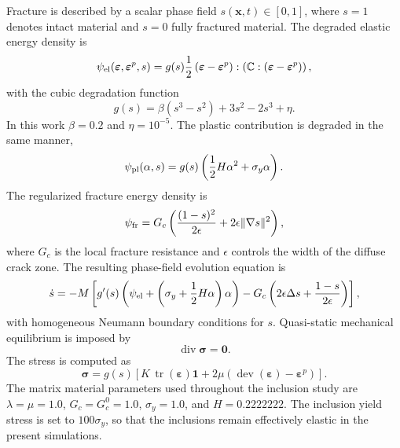 \documentclass[pdflatex,sn-mathphys-num]{sn-jnl}
\newcommand{\GcZero}{G_c^0}
\begin{document}
Fracture is described by a scalar phase field \(s(\boldsymbol{x},t)\in[0,1]\), where \(s=1\) denotes intact material and \(s=0\) fully fractured material. The degraded elastic energy density is
\begin{equation}
    \psi_{\rm el}(\boldsymbol{\varepsilon},\boldsymbol{\varepsilon}^p,s)
    = g(s)\frac{1}{2}
    \left(\boldsymbol{\varepsilon}-\boldsymbol{\varepsilon}^p\right)
    :
    \left(\boldsymbol{\mathbb{C}}:
    \left(\boldsymbol{\varepsilon}-\boldsymbol{\varepsilon}^p\right)\right),
\end{equation}
with the cubic degradation function
\begin{equation}
    g(s)=\beta(s^3-s^2)+3s^2-2s^3+\eta .
    \label{eq:deg_grad}
\end{equation}
In this work \(\beta=0.2\) and \(\eta=10^{-5}\). The plastic contribution is degraded in the same manner,
\begin{equation}
    \psi_{\rm pl}(\alpha,s)=g(s)\left(\frac{1}{2}H\alpha^2+\sigma_y\alpha\right).
\end{equation}
The regularized fracture energy density is
\begin{equation}
    \psi_{\rm fr}=G_c\left(\frac{(1-s)^2}{2\epsilon}+2\epsilon\|\nabla s\|^2\right),
\end{equation}
where \(G_c\) is the local fracture resistance and \(\epsilon\) controls the width of the diffuse crack zone. The resulting phase-field evolution equation is
\begin{align}
    \dot{s}=-M\left[
    g'(s)\left(\psi_{\rm el}+\left(\sigma_y+\frac{1}{2}H\alpha\right)\alpha\right)
    -G_c\left(2\epsilon\Delta s+\frac{1-s}{2\epsilon}\right)
    \right],
    \label{eq:evolution_s}
\end{align}
with homogeneous Neumann boundary conditions for \(s\). Quasi-static mechanical equilibrium is imposed by
\begin{equation}
    \operatorname{div}\boldsymbol{\sigma}=\boldsymbol{0}.
    \label{eq:equilibrium}
\end{equation}
The stress is computed as
\begin{equation}
    \boldsymbol{\sigma}=g(s)\left[
    K\,\operatorname{tr}(\boldsymbol{\varepsilon})\boldsymbol{1}
    +2\mu\left(\operatorname{dev}(\boldsymbol{\varepsilon})-\boldsymbol{\varepsilon}^p\right)
    \right].
    \label{eq:sigma_plast}
\end{equation}
The matrix material parameters used throughout the inclusion study are \(\lambda=\mu=1.0\), \(G_c=\GcZero=1.0\), \(\sigma_y=1.0\), and \(H=0.2222222\). The inclusion yield stress is set to \(100\sigma_y\), so that the inclusions remain effectively elastic in the present simulations.
\end{document}
